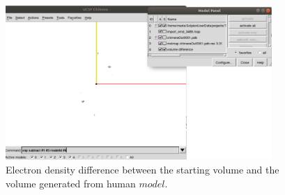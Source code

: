 \begin{itemize}
\begin{itemize}
  \begin{figure}[H]
    \centering 
    \captionsetup{width=.7\linewidth} 
    \includegraphics[width=0.90\textwidth]{Images/Fig44}
    \caption{Electron density difference between the starting volume  and the volume generated from human  $model$.}
    \label{fig:chimera_operate_vol_3}
   \end{figure}
  
  
  \end{itemize}
  
 
\end{itemize}
